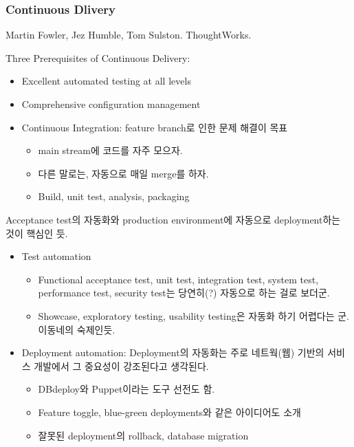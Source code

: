 \begin{frame}[allowframebreaks=0.5]
\frametitle{Continuous Dlivery}

Martin Fowler, Jez Humble, Tom Sulston. ThoughtWorks.

Three Prerequisites of Continuous Delivery:
\begin{itemize}
\item Excellent automated testing at all levels
\item Comprehensive configuration management
\item Continuous Integration: feature branch로 인한 문제 해결이 목표
  \begin{itemize}
  \item main stream에 코드를 자주 모으자.
  \item 다른 말로는, 자동으로 매일 merge를 하자.
  \item Build, unit test, analysis, packaging
  \end{itemize}
\end{itemize}

Acceptance test의 자동화와 production environment에 자동으로
deployment하는 것이 핵심인 듯.
 
\begin{itemize}
\item Test automation
  \begin{itemize}
  \item Functional acceptance test, unit test, integration test,
    system test, performance test, security test는 당연히(?) 자동으로
    하는 걸로 보더군.
  \item Showcase, exploratory testing, usability testing은 자동화 하기
    어렵다는 군. 이동네의 숙제인듯.
  \end{itemize}
\item Deployment automation: Deployment의 자동화는 주로 네트웍(웹)
  기반의 서비스 개발에서 그 중요성이 강조된다고 생각된다.
  \begin{itemize}
  \item DBdeploy와 Puppet이라는 도구 선전도 함.
  \item Feature toggle, blue-green deployments와 같은 아이디어도 소개
  \item 잘못된 deployment의 rollback, database migration
  \end{itemize}
\end{itemize}

\end{frame}
